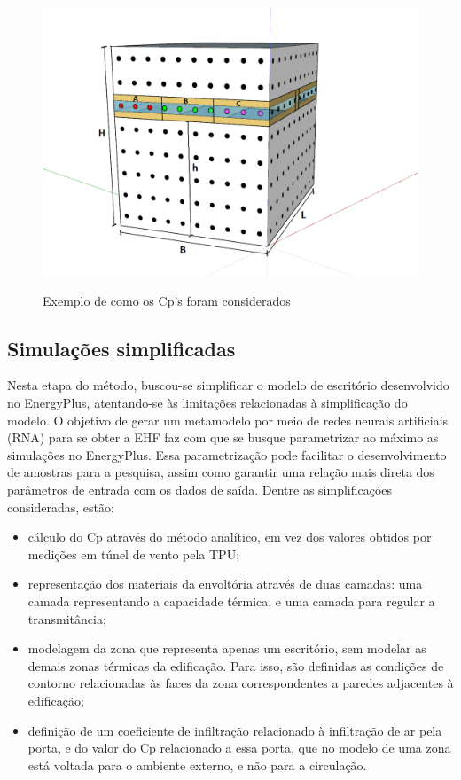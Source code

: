 \documentclass[brazil,hardcopy,openany,a5paper]{ufscthesis}
\begin{document}
		\begin{figure}[h]
			\centering
			\caption{Exemplo de como os Cp’s foram considerados}
			\includegraphics[width=1\linewidth]{img/ex_TPU_h.png}
			\label{fig:tpuwindows}
		\end{figure}
		
		
		\subsection{Simulações simplificadas}
		
		Nesta etapa do método, buscou-se simplificar o modelo de escritório desenvolvido no EnergyPlus, atentando-se às limitações relacionadas à simplificação do modelo.
		O objetivo de gerar um metamodelo por meio de redes neurais artificiais (RNA) para se obter a EHF faz com que se busque parametrizar ao máximo as simulações no EnergyPlus.
		Essa parametrização pode facilitar o desenvolvimento de amostras para a pesquisa, assim como garantir uma relação mais direta dos parâmetros de entrada com os dados de saída. 
		Dentre as simplificações consideradas, estão:
		
		\begin{itemize}
		\item cálculo do Cp através do método analítico, em vez dos valores obtidos por medições em túnel de vento pela TPU;
		\item representação dos materiais da envoltória através de duas camadas: uma camada representando a capacidade térmica, e uma camada para regular a transmitância;  %
		\item modelagem da zona que representa apenas um escritório, sem modelar as demais zonas térmicas da edificação. Para isso, são definidas as condições de contorno relacionadas às faces da zona correspondentes a paredes adjacentes à edificação;
		\item definição de um coeficiente de infiltração relacionado à infiltração de ar pela porta, e do valor do Cp relacionado a essa porta, que no modelo de uma zona está voltada para o ambiente externo, e não para a circulação.
		\end{itemize}
		
\end{document}
